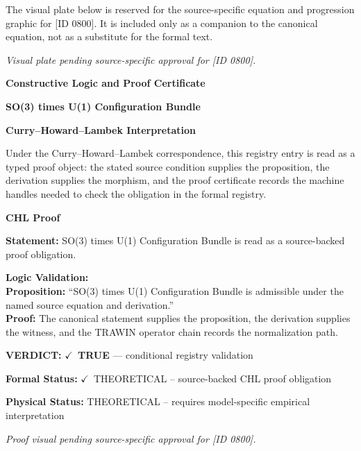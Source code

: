 \begingroup\footnotesize\sloppy
The visual plate below is reserved for the source-specific equation and progression graphic for [ID 0800]. It is included only as a companion to the canonical equation, not as a substitute for the formal text.
\par\endgroup
\begingroup\footnotesize\itshape
Visual plate pending source-specific approval for [ID 0800].
\par\endgroup

\clearpage
\begingroup\tzpsupportsetup
\noindent\textbf{\fontsize{10.8pt}{12.8pt}\selectfont [ID 0800] Constructive Logic and Proof Certificate}\par
\noindent\textbf{\fontsize{10pt}{12pt}\selectfont SO(3) times U(1) Configuration Bundle}\par
\vspace{0.45em}
\begingroup
\footnotesize
\setlength{\parskip}{0.22em}
\setlength{\parindent}{0pt}
\noindent\textbf{Curry--Howard--Lambek Interpretation}\par
Under the Curry--Howard--Lambek correspondence, this registry entry is read as a typed proof
object: the stated source condition supplies the proposition, the derivation supplies the
morphism, and the proof certificate records the machine handles needed to check the obligation
in the formal registry.

\vspace{0.45em}
\noindent\textbf{CHL Proof}\par
\textbf{Statement:} SO(3) times U(1) Configuration Bundle is read as a source-backed proof obligation.

\textbf{Logic Validation:}\\
\textbf{Proposition:} ``SO(3) times U(1) Configuration Bundle is admissible under the named source equation and derivation.''\\
\textbf{Proof:} The canonical statement supplies the proposition, the derivation supplies the witness, and the TRAWIN operator chain records the normalization path.

\textbf{VERDICT:} \ensuremath{\checkmark}\ \textbf{TRUE} --- conditional registry validation

\textbf{Formal Status:} \ensuremath{\checkmark}\ THEORETICAL -- source-backed CHL proof obligation

\textbf{Physical Status:} THEORETICAL -- requires model-specific empirical interpretation
\par\vspace{0.45em}
\par
\vfill
\begingroup\footnotesize\itshape
Proof visual pending source-specific approval for [ID 0800].
\par\endgroup
\vfill
\endgroup
\endgroup
